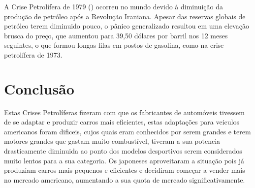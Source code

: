 \documentclass[a4paper]{article}
\begin{document}
A Crise Petrolífera de 1979 (\cite{pet79}) ocorreu no mundo devido à diminuição da produção de petróleo após a Revolução Iraniana. 
Apesar das reservas globais de petróleo terem diminuido pouco, o pânico generalizado resultou em uma elevação brusca do preço, 
que aumentou para 39,50 dólares por barril nos 12 meses seguintes, o que formou longas filas em postos de gasolina, como na crise petrolífera de 1973.
\section{Conclusão}\label{con}
Estas Crises Petrolíferas fizeram com que os fabricantes de automóveis tivessem de se adaptar e produzir carros mais eficientes, estas adaptações para 
veiculos americanos foram dificeis, cujos quais eram conhecidos por serem grandes e terem motores grandes que gastam muito combustível,
tiveram a sua potencia drasticamente diminuida ao ponto dos modelos desportivos serem considerados muito lentos para a sua categoria.
Os japoneses aproveitaram a situação pois já produziam carros mais pequenos e eficientes e decidiram começar a vender mais no mercado americano,
aumentando a sua quota de mercado significativamente.

\newpage
\renewcommand{\refname}{Bibliografia} %
\renewcommand{\bibname}{Bibliografia} %
\printbibliography
\end{document}
